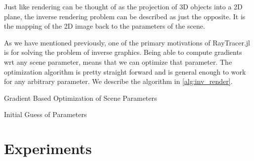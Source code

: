 \documentclass{juliacon}
\begin{document}

Just like rendering can be thought of as the projection of 3D objects into a 2D plane, the inverse rendering problem can be described as just the opposite. It is the mapping of the 2D image back to the parameters of the scene.

As we have mentioned previously, one of the primary motivations of RayTracer.jl is for solving the problem of inverse graphics. Being able to compute gradients wrt any scene parameter, means that we can optimize that parameter. The optimization algorithm is pretty straight forward and is general enough to work for any arbitrary parameter. We describe the algorithm in \ref{alg:inv_render}.

\begin{algorithm}[!htb]
    \caption{Gradient Based Optimization of Scene Parameters}
    \label{alg:inv_render}
    \SetAlgoLined
    Initial Guess of Parameters\;
\end{algorithm}

\section{Experiments}
\end{document}
